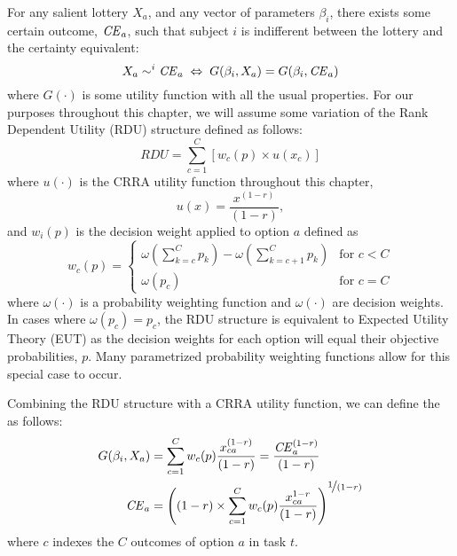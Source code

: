 \documentclass[../main.tex]{subfiles}
\begin{document}
For any salient lottery $X_a$, and any vector of parameters $\beta_i$, there exists some certain outcome, $\mathit{CE}_a$, such that subject $i$ is indifferent between the lottery and the certainty equivalent:
\begin{equation}
	\label{eq3:CE.indiff}
	X_a \sim^i {\mathit{CE}}_a \;\Leftrightarrow\; G(\beta_i,X_a) = G(\beta_i, {\mathit{CE}}_a)
\end{equation}
\noindent where $G(\cdot)$ is some utility function with all the usual properties.
For our purposes throughout this chapter, we will assume some variation of the Rank Dependent Utility (RDU) structure defined as follows:
\begin{equation}
	\label{eq3:RDU}
	RDU = \sum_{c=1}^{C} \left[ w_c(p) \times u(x_c) \right]
\end{equation}
\noindent where $u(\cdot)$ is the CRRA utility function throughout this chapter,
\begin{equation}
	\label{eq3:CRRA}
	u(x) = \frac{x^{(1-r)}}{(1-r)} ,
\end{equation}
\noindent and $w_i(p)$ is the decision weight applied to option $a$ defined as
\begin{equation}
	\label{eq3:dweight}
	w_c(p) =
	\begin{cases}
		\omega\left(\displaystyle\sum_{k=c}^C p_k\right) - \omega\left(\displaystyle\sum_{k=c+1}^C p_k\right) & \text{for } c<C \\
		\omega(p_c) & \text{for } c = C
	\end{cases}
\end{equation}
\noindent where $\omega(\cdot)$ is a probability weighting function and $\omega(\cdot)$ are decision weights.
In cases where $\omega(p_c) = p_c$, the RDU structure is equivalent to Expected Utility Theory (EUT) as the decision weights for each option will equal their objective probabilities, $p$.
Many parametrized probability weighting functions allow for this special case to occur.

Combining the RDU structure with a CRRA utility function, we can define the {\CE} as follows:
\begin{align}
	\label{eq3:CEcalc}
	\begin{split}
		G(\beta_i,X_a) &= \sum_{c=1}^{C} w_c(p) \frac{x_{ca}^{(1-r)}}{(1-r)} = \frac{ {\mathit{CE}}_a^{(1-r)}}{(1-r)}\\
		{\mathit{CE}}_a &=  \left( (1-r) \times \sum_{c=1}^{C} w_c(p) \frac{x_{ca}^{1-r}}{(1-r)} \right)^{ \displaystyle\nicefrac{1}{(1-r)} }
	\end{split}
\end{align}
\noindent where $c$ indexes the $C$ outcomes of option $a$ in task $t$.
\end{document}
